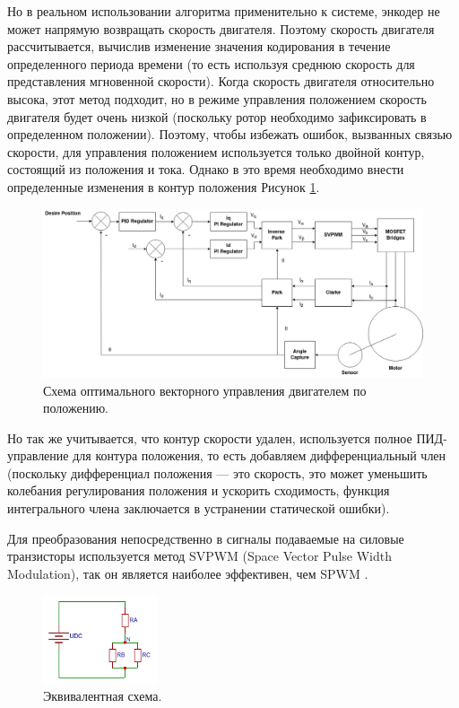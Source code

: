 Но в реальном использовании алгоритма применительно к системе, энкодер не может напрямую возвращать скорость двигателя. Поэтому скорость двигателя рассчитывается, вычислив изменение значения кодирования в течение определенного периода времени (то есть используя среднюю скорость для представления мгновенной скорости). Когда скорость двигателя относительно высока, этот метод подходит, но в режиме управления положением скорость двигателя будет очень низкой (поскольку ротор необходимо зафиксировать в определенном положении).
Поэтому, чтобы избежать ошибок, вызванных связью скорости, для управления положением  используется только двойной контур, состоящий из положения и тока. Однако в это время необходимо внести определенные изменения в контур положения Рисунок \ref{ACDFOCALGPOSREAL}.

\begin{figure}[H]
	\centering
	\includegraphics[width=\textwidth]{Src/images/foc pos real.drawio.png}
	\caption{Схема оптимального векторного управления двигателем по положению.}
	\label{ACDFOCALGPOSREAL}
\end{figure}

Но так же учитывается, что контур скорости удален, используется полное ПИД-управление для контура положения, то есть добавляем дифференциальный член (поскольку дифференциал положения — это скорость, это может уменьшить колебания регулирования положения и ускорить сходимость, функция интегрального члена заключается в устранении статической ошибки).



Для преобразования непосредственно в сигналы подаваемые на силовые транзисторы используется метод SVPWM (Space Vector Pulse Width Modulation), так он является наиболее эффективен, чем SPWM \citep{Mirdas2023}.

\begin{figure}[H]
	\centering
	\includegraphics[width=0.3\textwidth]{Src/images/3phasesimpl.png}
	\caption{Эквивалентная схема.}
	\label{ACDFOC3P}
\end{figure}

